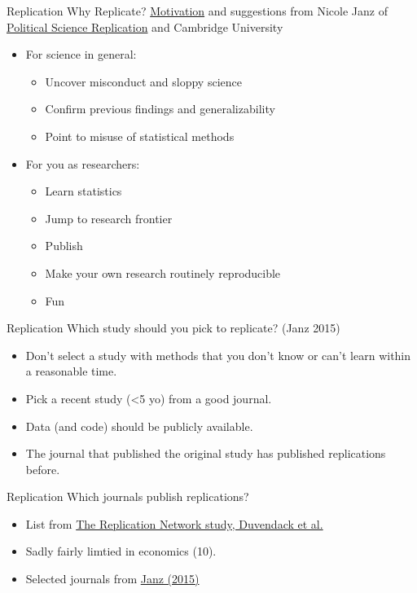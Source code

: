 \documentclass{beamer}
\begin{document}
\begin{frame}{Replication}
Why Replicate? \href{https://osf.io/ap6xz/}{Motivation} and suggestions from Nicole Janz of \href{https://politicalsciencereplication.wordpress.com/}{Political Science Replication} and Cambridge University
\begin{itemize}
\item For science in general:
\begin{itemize}\pause
\item Uncover misconduct and sloppy science
\item Confirm previous findings and generalizability
\item Point to misuse of statistical methods
\end{itemize}
\item For you as researchers:
\begin{itemize}\pause
\item Learn statistics
\item Jump to research frontier
\item Publish
\item Make your own research routinely reproducible
\item Fun
\end{itemize}
\end{itemize}
\end{frame}


\begin{frame}{Replication}
Which study should you pick to replicate? (Janz 2015)
\begin{itemize}
\item Don't select a study with methods that you don't know or can't learn within a reasonable time.
\item Pick a recent study (<5 yo) from a good journal.
\item Data (and code) should be publicly available.
\item The journal that published the original study has published replications before.
\end{itemize}
\end{frame}

\begin{frame}{Replication}
Which journals publish replications?
\begin{itemize}
\item List from \href{http://econjwatch.org/articles/replications-in-economics-a-progress-report}{The Replication Network study, Duvendack et al.}
\item Sadly fairly limtied in economics (10).
\item Selected journals from \href{https://osf.io/ap6xz/}{Janz (2015)}
\end{itemize}
\end{frame}
\end{document}
